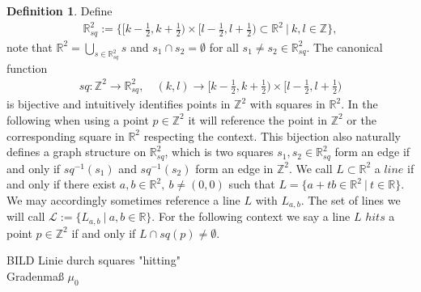 \documentclass[12pt,a4paper]{scrartcl}
\numberwithin{equation}{section}
\numberwithin{equation}{section}%
\theoremstyle{definition}
\newtheorem{definition}[theorem]{Definition}
\theoremstyle{definition}
\begin{document}
\begin{definition}
	Define 
	\begin{align}
		\mathbb{R}^2_{sq} := \{[k - \frac{1}{2}, k + \frac{1}{2}) \times [l- \frac{1}{2}, l + \frac{1}{2}) \subset \mathbb{R}^2\ |\ k,l \in \mathbb{Z}\}, 
	\end{align} 
	note that $\mathbb{R}^2 = \bigcup_{s\in \mathbb{R}^2_{sq}} s$ and $s_1\cap s_2 = \emptyset$ for all $s_1\neq s_2\in \mathbb{R}^2_{sq}$. The canonical function
	\begin{align}
	sq: \mathbb{Z}^2 \to \mathbb{R}^2_{sq},\quad (k,l)\to [k - \frac{1}{2}, k + \frac{1}{2}) \times [l- \frac{1}{2}, l + \frac{1}{2})
	\end{align}
	is bijective and intuitively identifies points in $\mathbb{Z}^2$ with squares in $\mathbb{R}^2$. In the following when using a point $p\in \mathbb{Z}^2$ it will reference the point in $\mathbb{Z}^2$ or the corresponding square in $\mathbb{R}^2$ respecting the context. This bijection also naturally defines a graph structure on $\mathbb{R}^2_{sq}$, which is two squares $s_1, s_2\in \mathbb{R}^2_{sq}$ form an edge if and only if $sq^{-1}(s_1)$ and $sq^{-1}(s_2)$ form an edge in $\mathbb{Z}^2$. We call $L\subset \mathbb{R}^2$ a $line$ if and only if there exist $a,b\in \mathbb{R}^2,\ b\neq (0,0)$ such that $L=\{a+tb\in \mathbb{R}^2\ |\ t\in \mathbb{R}\}$. We may accordingly sometimes reference a line $L$ with $L_{a,b}$. The set of lines we will call $\mathcal{L} := \{L_{a,b}\ |\ a,b\in \mathbb{R}\}$. For the following context we say a line $L$ $hits$ a point $p\in \mathbb{Z}^2$ if and only if $L\cap sq(p) \neq \emptyset$.
	
\end{definition}

BILD Linie durch squares "hitting"\\
Gradenmaß $\mu_0$
\end{document}
